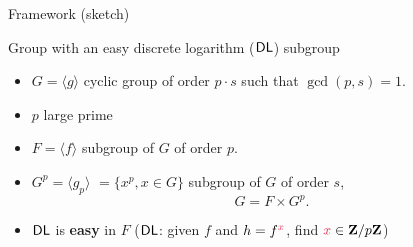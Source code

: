 \begin{frame}{Framework (sketch) \cite{RSA:CasLag15}}
\begin{block}{Group with an easy discrete logarithm ($\mathsf{DL}$) subgroup}

\begin{itemize}
\item \textcolor{mLightBrown}{$G=\langle g\rangle$} cyclic group of order $p\cdot s$ such that \textcolor{mLightBrown}{$\gcd(p,s)=1$}.
\item \textcolor{mLightBrown}{$p$} large prime
\item \textcolor{mLightBrown}{$F=\langle f \rangle$} subgroup of $G$ 
of order $p$.
\item \textcolor{mLightBrown}{$G^p= \langle g_p\rangle$} $=\{x^p, x \in G\}$ subgroup of $G$
of order $s$,$$G = F \times G^p.$$
\vspace{-0.3cm}
\item \textcolor{mLightBrown}{$\mathsf{DL}$} is \textbf{easy} in $F$\hspace{1cm} ($\mathsf{DL}$: given $f$ and $h=f^{\textcolor{amaranth}{x}}$, find $\textcolor{amaranth}{x}\in\Zp$)
\end{itemize}
%   
\end{block}
\end{frame}
